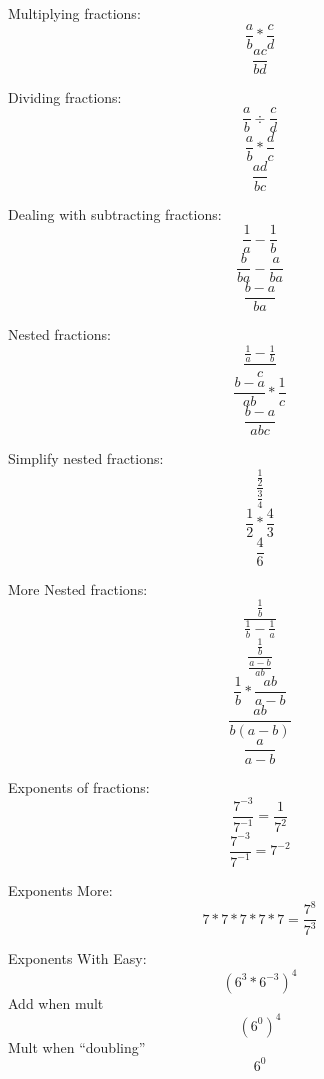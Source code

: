 \documentclass{article}
\begin{document}
Multiplying fractions:
$$\frac{a}{b} * \frac{c}{d}$$
$$\frac{ac}{bd}$$

Dividing fractions:
$$\frac{a}{b} \div \frac{c}{d}$$
$$\frac{a}{b} * \frac{d}{c}$$
$$\frac{ad}{bc}$$

Dealing with subtracting fractions:
$$\frac{1}{a} - \frac{1}{b}$$
$$\frac{b}{ba} - \frac{a}{ba}$$
$$\frac{b-a}{ba}$$

Nested fractions:
$$\frac{\frac{1}{a} - \frac{1}{b}}{c}$$
$$\frac{b-a}{ab} * \frac{1}{c}$$
$$\frac{b-a}{abc}$$

Simplify nested fractions:
$$\frac{\frac{1}{2}}{\frac{3}{4}}$$
$$\frac{1}{2}*\frac{4}{3}$$
$$\frac{4}{6}$$

More Nested fractions:
$$\frac{\frac{1}{b}}{\frac{1}{b} - \frac{1}{a}}$$
$$\frac{\frac{1}{b}}{\frac{a-b}{ab}}$$
$$\frac{1}{b}*\frac{ab}{a-b}$$
$$\frac{ab}{b(a-b)}$$
$$\frac{a}{a-b}$$

Exponents of fractions:
$$\frac{7^{-3}}{7^{-1}} = \frac{1}{7^{2}}$$
$$\frac{7^{-3}}{7^{-1}} = 7^{-2}$$

Exponents More:
$$7*7*7*7*7 = \frac{7^{8}}{7^{3}}$$

Exponents With Easy:
$$(6^{3}*6^{-3})^{4}$$
Add when mult
$$(6^{0})^{4}$$
Mult when ``doubling''
$$6^{0}$$
\end{document}
